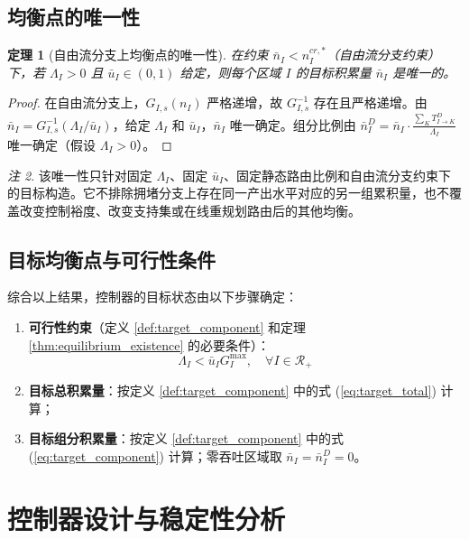 \documentclass[a4paper,12pt]{article}
\theoremstyle{plain}
\newtheorem{theorem}{定理}[section]
\theoremstyle{definition}
\theoremstyle{remark}
\newtheorem{remark}[theorem]{注}
\begin{document}
\subsection{均衡点的唯一性}

\begin{theorem}[自由流分支上均衡点的唯一性]\label{thm:equilibrium_uniqueness}
在约束 $\bar{n}_I < n_I^{cr,*}$（自由流分支约束）下，若 $\Lambda_I > 0$ 且 $\bar u_I\in(0,1)$ 给定，则每个区域 $I$ 的目标积累量 $\bar{n}_I$ 是唯一的。
\end{theorem}

\begin{proof}
在自由流分支上，$G_{I,s}(n_I)$ 严格递增，故 $G_{I,s}^{-1}$ 存在且严格递增。由 $\bar{n}_I = G_{I,s}^{-1}(\Lambda_I/\bar u_I)$，给定 $\Lambda_I$ 和 $\bar u_I$，$\bar{n}_I$ 唯一确定。组分比例由 $\bar{n}_I^D = \bar{n}_I \cdot \frac{\sum_K T_{I \to K}^D}{\Lambda_I}$ 唯一确定（假设 $\Lambda_I > 0$）。
\end{proof}

\begin{remark}
该唯一性只针对固定 $\Lambda_I$、固定 $\bar u_I$、固定静态路由比例和自由流分支约束下的目标构造。它不排除拥堵分支上存在同一产出水平对应的另一组累积量，也不覆盖改变控制裕度、改变支持集或在线重规划路由后的其他均衡。
\end{remark}

\subsection{目标均衡点与可行性条件}

综合以上结果，控制器的目标状态由以下步骤确定：
\begin{enumerate}
    \item \textbf{可行性约束}（定义 \ref{def:target_component} 和定理 \ref{thm:equilibrium_existence} 的必要条件）：
    \begin{equation} \label{eq:feasibility}
        \Lambda_I < \bar u_I G_I^{\max}, \quad \forall I \in \mathcal{R}_+
    \end{equation}
    \item \textbf{目标总积累量}：按定义 \ref{def:target_component} 中的式 (\ref{eq:target_total}) 计算；
    \item \textbf{目标组分积累量}：按定义 \ref{def:target_component} 中的式 (\ref{eq:target_component}) 计算；零吞吐区域取 $\bar n_I=\bar n_I^D=0$。
\end{enumerate}

\section{控制器设计与稳定性分析}
\end{document}
